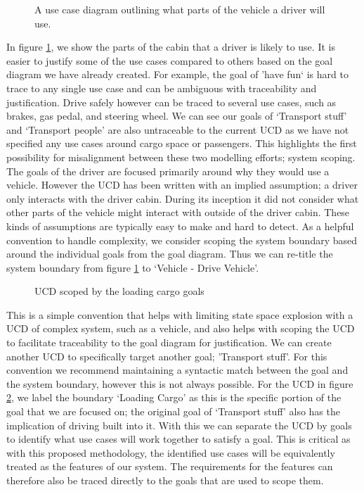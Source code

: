 \begin{figure}
	\centering
	
	\caption{A use case diagram outlining what parts of the vehicle a driver will use.}
	\label{fig:Driver_UCD}
\end{figure} 

In figure \ref{fig:Driver_UCD}, we show the parts of the cabin that a driver is likely to use. It is easier to justify some of the use cases compared to others based on the goal diagram we have already created. For example, the goal of 'have fun` is hard to trace to any single use case and can be ambiguous with traceability and justification. Drive safely however can be traced to several use cases, such as brakes, gas pedal, and steering wheel. We can see our goals of `Transport stuff' and `Transport people' are also untraceable to the current \ac{UCD} as we have not specified any use cases around cargo space or passengers. This highlights the first possibility for misalignment between these two modelling efforts; system scoping. The goals of the driver are focused primarily around why they would use a vehicle. However the \ac{UCD} has been written with an implied assumption; a driver only interacts with the driver cabin. During its inception it did not consider what other parts of the vehicle might interact with outside of the driver cabin. These kinds of assumptions are typically easy to make and hard to detect. As a helpful convention to handle complexity, we consider scoping the system boundary based around the individual goals from the goal diagram. Thus we can re-title the system boundary from figure \ref{fig:Driver_UCD} to `Vehicle - Drive Vehicle'.

\begin{figure}
	\centering
	
	\caption{\ac{UCD} scoped by the loading cargo goals}
	\label{fig:Cargo_UCD}
\end{figure}

This is a simple convention that helps with limiting state space explosion with a \ac{UCD} of complex system, such as a vehicle, and also helps with scoping the \ac{UCD} to facilitate traceability to the goal diagram for justification. We can create another \ac{UCD} to specifically target another goal; 'Transport stuff'. For this convention we recommend maintaining a syntactic match between the goal and the system boundary, however this is not always possible. For the \ac{UCD} in figure \ref{fig:Cargo_UCD}, we label the boundary `Loading Cargo' as this is the specific portion of the goal that we are focused on; the original goal of `Transport stuff' also has the implication of driving built into it. With this we can separate the \ac{UCD} by goals to identify what use cases will work together to satisfy a goal. This is critical as with this proposed methodology, the identified use cases will be equivalently treated as the features of our system. The requirements for the features can therefore also be traced directly to the goals that are used to scope them. 


